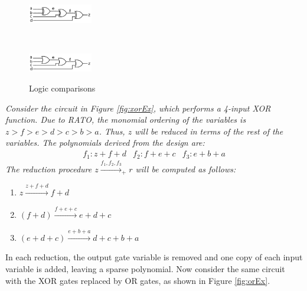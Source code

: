 \begin{Example}
\begin{figure}[h]
        \centering
        \begin{subfloat}{%
                \includegraphics[width=0.25\textwidth]{./figures/xor-example}
                \label{fig:xorEx}}
        \end{subfloat}%
        ~ %
        \begin{subfloat}[][OR logic]{%
                \includegraphics[width=0.25\textwidth]{./figures/or-example}
                \label{fig:orEx}}
        \end{subfloat}
        \caption{Logic comparisons}\label{fig:logicExmp}
\end{figure}


{\it 
Consider the circuit in Figure \ref{fig:xorEx}, which performs a 4-input
XOR function. Due to RATO, the monomial ordering of the variables is 
$z > f > e > d > c> b >a$. Thus, $z$ will be reduced in terms of the rest of the 
variables. The polynomials derived from the design are:
\begin{eqnarray}
f_1:z+f+d & f_2:f+e+c & f_3:e+b+a \nonumber
\end{eqnarray}
The reduction procedure $z \xrightarrow{f_1,f_2,f_3}_+ r$ will be computed as follows:
\begin{enumerate}
\item $z \xrightarrow{z+f+d} f+d$
\item $(f+d)\xrightarrow{f+e+c}e+d+c$
\item $(e+d+c)\xrightarrow{e+b+a}d+c+b+a$
\end{enumerate}
In each reduction, the output gate variable is removed and one copy of each 
input variable is added, leaving a sparse polynomial. Now consider the same 
circuit with the XOR gates replaced by OR gates, as shown in Figure \ref{fig:orEx}.

}
\end{Example}
